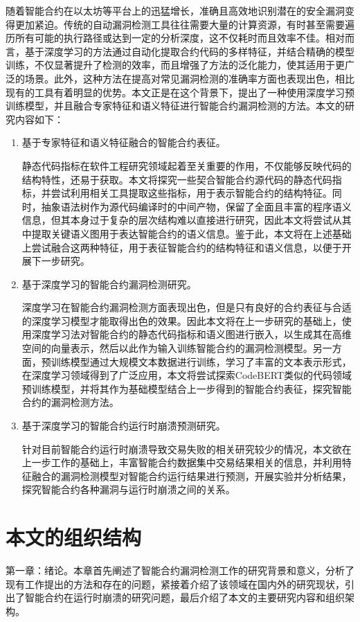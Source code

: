 随着智能合约在以太坊等平台上的迅猛增长，准确且高效地识别潜在的安全漏洞变得更加紧迫。传统的自动漏洞检测工具往往需要大量的计算资源，有时甚至需要遍历所有可能的执行路径或达到一定的分析深度，这不仅耗时而且效率不佳。相对而言，基于深度学习的方法通过自动化提取合约代码的多样特征，并结合精确的模型训练，不仅显著提升了检测的效率，而且增强了方法的泛化能力，使其适用于更广泛的场景。此外，这种方法在提高对常见漏洞检测的准确率方面也表现出色，相比现有的工具有着明显的优势。本文正是在这个背景下，提出了一种使用深度学习预训练模型，并且融合专家特征和语义特征进行智能合约漏洞检测的方法。本文的研究内容如下：
\begin{enumerate}[label=(\arabic*)]
    \item 基于专家特征和语义特征融合的智能合约表征。
    
    静态代码指标在软件工程研究领域起着至关重要的作用，不仅能够反映代码的结构特性，还易于获取。本文将探究一些契合智能合约源代码的静态代码指标，并尝试利用相关工具提取这些指标，用于表示智能合约的结构特征。同时，抽象语法树作为源代码编译时的中间产物，保留了全面且丰富的程序语义信息，但其本身过于复杂的层次结构难以直接进行研究，因此本文将尝试从其中提取关键语义图用于表达智能合约的语义信息。鉴于此，本文将在上述基础上尝试融合这两种特征，用于表征智能合约的结构特征和语义信息，以便于开展下一步研究。
    \item 基于深度学习的智能合约漏洞检测研究。
    
    深度学习在智能合约漏洞检测方面表现出色，但是只有良好的合约表征与合适的深度学习模型才能取得出色的效果。因此本文将在上一步研究的基础上，使用深度学习法对智能合约的静态代码指标和语义图进行嵌入，以生成其在高维空间的向量表示，然后以此作为输入训练智能合约的漏洞检测模型。另一方面，预训练模型通过大规模文本数据进行训练，学习了丰富的文本表示形式，在深度学习领域得到了广泛应用，本文将尝试探索CodeBERT类似的代码领域预训练模型，并将其作为基础模型结合上一步得到的智能合约表征，探究智能合约的漏洞检测方法。
    \item 基于深度学习的智能合约运行时崩溃预测研究。
    
    针对目前智能合约运行时崩溃导致交易失败的相关研究较少的情况，本文欲在上一步工作的基础上，丰富智能合约数据集中交易结果相关的信息，并利用特征融合的漏洞检测模型对智能合约运行结果进行预测，开展实验并分析结果，探究智能合约各种漏洞与运行时崩溃之间的关系。
    
\end{enumerate}
\section{本文的组织结构}
\label{sec:本文的组织结构}
第一章：绪论。本章首先阐述了智能合约漏洞检测工作的研究背景和意义，分析了现有工作提出的方法和存在的问题，紧接着介绍了该领域在国内外的研究现状，引出了智能合约在运行时崩溃的研究问题，最后介绍了本文的主要研究内容和组织架构。


